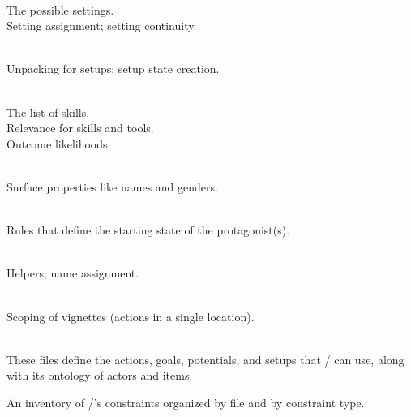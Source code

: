 \begin{table}[!p]
\begin{minipage}[t][0.935\textheight]{\dimexpr0.5\textwidth-1.2em}
\begin{hangparas}{0.8em}{1}
   \\
  \cg{[content]} The possible settings. \\
  \cg{[representational]} Setting assign\-ment; setting continuity.

   \\
  \cg{[representational]} Unpacking for setups; setup state creation.

   \\
  \cg{[content]} The list of skills. \\
  \cg{[representational]} Relevance for skills and tools. \\
  \cg{[constituent]} Outcome likelihoods.

   \\
  \cg{[representational]} Surface properties like names and genders.

   \\
  \cg{[content]} Rules that define the starting state of the protagonist(s).

   \\
  \cg{[other]} Helpers; name assignment.

   \\
  \cg{[constituent]} Scoping of vignettes (actions in a single location).

   \\
  \cg{[content]} These files define the actions, goals, potentials, and setups that \dunyazad/ can use, along with its ontology of actors and items.
\end{hangparas}%
\end{minipage}%
\caption[\dunyazad/ constraints inventory]{An inventory of \dunyazad/'s constraints organized by file and by constraint type.}
\label{tab:dunyazad-constraints-inventory}
\end{table}

